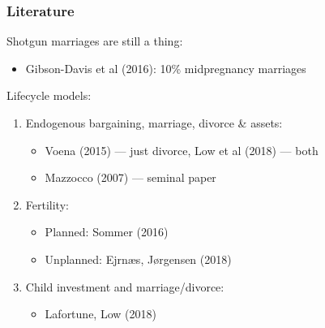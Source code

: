 \documentclass{beamer}
\begin{document}
\begin{frame}
\frametitle{Literature}
Shotgun marriages are still a thing:
\begin{itemize}
\item Gibson-Davis et al (2016): 10\% midpregnancy marriages
\end{itemize}
Lifecycle models:
\begin{enumerate}
\item Endogenous bargaining, marriage, divorce \& assets:
\begin{itemize}
\item Voena (2015) --- just divorce, Low et al (2018) --- both
\item Mazzocco (2007) --- seminal paper
\end{itemize}
\item Fertility:
\begin{itemize}
\item Planned: Sommer (2016)
\item Unplanned: Ejrnæs, Jørgensen (2018)
\end{itemize}
\item Child investment and marriage/divorce:
\begin{itemize}
\item Lafortune, Low (2018)
\end{itemize}
\end{enumerate}
%

\end{frame}
\end{document}
